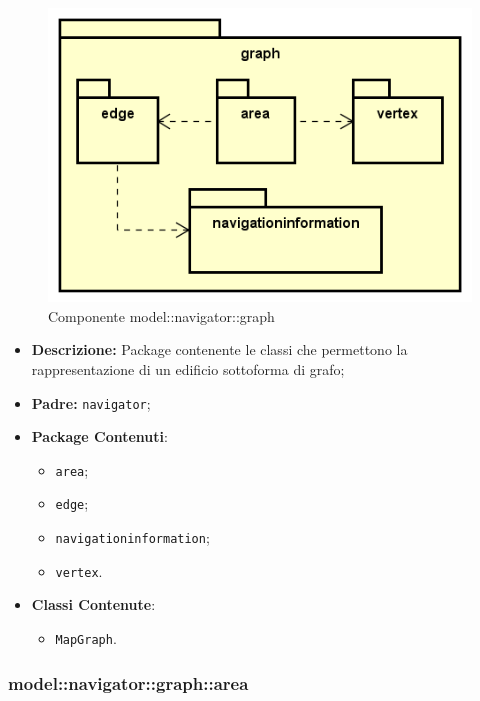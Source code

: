 \documentclass[../DefinizioneDiProdotto.tex]{subfiles}
\begin{document}
    \begin{figure}[H]
        \centering
        \includegraphics{img/package/graph.png}
        \caption{Componente model::\-navigator::\-graph}\label{fig:model::navigator::graph} 
    \end{figure}
    \begin{itemize}
\item \textbf{Descrizione:} Package contenente le classi che permettono la rappresentazione di un edificio sottoforma di grafo;
\item \textbf{Padre:} \texttt{navigator};
\item \textbf{Package Contenuti}:
\begin{itemize}
\item \texttt{area};

\item \texttt{edge};

\item \texttt{navigationinformation};

\item \texttt{vertex}.

\end{itemize}
\item \textbf{Classi Contenute}:
\begin{itemize}
\item \texttt{MapGraph}.

\end{itemize}
\end{itemize}

\subsubsection{model::\-navigator::\-graph::\-area}
\end{document}
